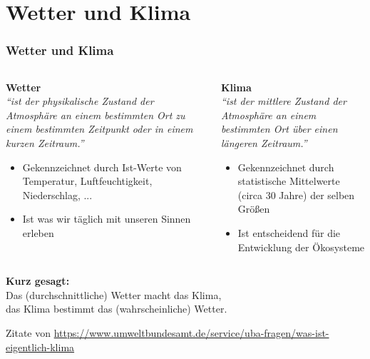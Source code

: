 \section{Wetter und Klima}

\begin{frame}
	\frametitle{Wetter und Klima}
  \begin{columns}[onlytextwidth]
    \begin{column}[t]{0.49\linewidth}
    \textbf{Wetter}\\
      \textit{\enquote{ist der physikalische Zustand der Atmosphäre an einem bestimmten Ort zu einem \alert{bestimmten Zeitpunkt} oder in einem kurzen Zeitraum.}}
      \begin{itemize}
        \item Gekennzeichnet durch Ist-Werte von Temperatur, Luftfeuchtigkeit, Niederschlag, ...
        \item Ist was wir täglich mit unseren Sinnen erleben
      \end{itemize}
    \end{column}%
    \begin{column}[t]{0.49\linewidth}
      \textbf{Klima}\\
      \textit{\enquote{ist der mittlere Zustand der Atmosphäre an einem bestimmten Ort über einen \alert{längeren Zeitraum.}}}
      \begin{itemize}
        \item Gekennzeichnet durch statistische Mittelwerte (circa 30 Jahre) der selben Größen
        \item Ist entscheidend für die Entwicklung der Ökosysteme
      \end{itemize}
    \end{column}%
  \end{columns}

  \bigskip
  \begin{center}
    \textbf{Kurz gesagt:}\\
    Das (durchschnittliche) Wetter macht das Klima, \\
    das Klima bestimmt das (wahrscheinliche) Wetter.
  \end{center}


  \vfill
	\tiny{Zitate von \url{https://www.umweltbundesamt.de/service/uba-fragen/was-ist-eigentlich-klima}}
\end{frame}
